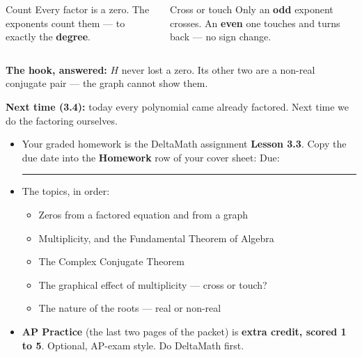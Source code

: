 \documentclass[aspectratio=169, 11pt]{beamer}
\begin{document}
\begin{frame}[t, plain]

  \begin{columns}[T]
      \begin{block}{Count}
        Every factor is a zero. The exponents count them --- to exactly the
        \textbf{degree}.
      \end{block}
      \begin{block}{Cross or touch}
        Only an \textbf{odd} exponent crosses. An \textbf{even} one touches and turns back ---
        no sign change.
      \end{block}
  \end{columns}

  \bigskip
  \textbf{The hook, answered:} \(H\) never lost a zero. Its other two are a non-real conjugate
  pair --- the graph cannot show them.

  \bigskip
  \textbf{Next time (3.4):} today every polynomial came already factored. Next time we do the
  factoring ourselves.
\end{frame}

\begin{frame}[t, plain]

  \begin{itemize}\setlength{\itemsep}{8pt}
    \item Your graded homework is the DeltaMath assignment \textbf{Lesson 3.3}.
          Copy the due date into the \textbf{Homework} row of your cover sheet:
          \quad Due: \rule{3cm}{0.4pt}
    \item The topics, in order:
          \begin{itemize}\setlength{\itemsep}{2pt}
            \item Zeros from a factored equation and from a graph
            \item Multiplicity, and the Fundamental Theorem of Algebra
            \item The Complex Conjugate Theorem
            \item The graphical effect of multiplicity --- cross or touch?
            \item The nature of the roots --- real or non-real
          \end{itemize}
    \item \textbf{AP Practice} (the last two pages of the packet) is
          \textbf{extra credit, scored 1 to 5}. Optional, AP-exam style. Do DeltaMath first.
  \end{itemize}
\end{frame}
\end{document}
